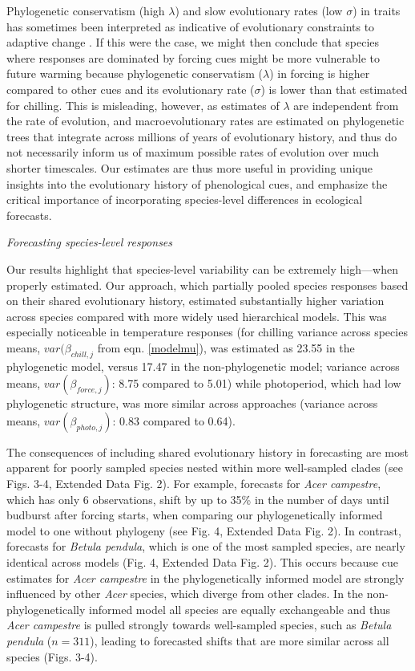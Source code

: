 \documentclass[11pt]{article}
\begin{document}
\par Phylogenetic conservatism (high $\lambda$) and slow evolutionary rates (low $\sigma$) in traits has sometimes been interpreted as indicative of evolutionary constraints to adaptive change \citep{wiens2010niche,bennett2021evolution}. If this were the case, we might then conclude that species where responses are dominated by forcing cues might be more vulnerable to future warming because phylogenetic conservatism ($\lambda$) in forcing is higher compared to other cues and its evolutionary rate ($\sigma$) is lower than that estimated for chilling. This is misleading, however, as estimates of $\lambda$ are independent from the rate of evolution, and macroevolutionary rates are estimated on phylogenetic trees that integrate across millions of years of evolutionary history, and thus do not necessarily inform us of maximum possible rates of evolution over much shorter timescales. Our estimates are thus more useful in providing unique insights into the evolutionary history of phenological cues, and emphasize the critical importance of incorporating species-level differences in ecological forecasts.


\emph{Forecasting species-level responses}

\par Our results highlight that species-level variability can be extremely high---when properly estimated. Our approach, which partially pooled species responses based on their shared evolutionary history, estimated substantially higher variation across species compared with more widely used hierarchical models. This was especially noticeable in temperature responses (for chilling variance across species means, $var(\beta_{chill,j}$ from eqn. \ref{modelmu}), was estimated as 23.55 in the phylogenetic model, versus 17.47 in the non-phylogenetic model; variance across means, $var(\beta_{force,j})$: 8.75 compared to 5.01) while photoperiod, which had low phylogenetic structure, was more similar across approaches (variance across means, $var(\beta_{photo,j})$: 0.83 compared to 0.64). 

\par The consequences of including shared evolutionary history in forecasting are most apparent for poorly sampled species nested within more well-sampled clades (see Figs. 3-4, Extended Data Fig. 2). For example, forecasts for \emph{Acer campestre}, which has only 6 observations, shift by up to 35\% in the number of days until budburst after forcing starts, when comparing our phylogenetically informed model to one without phylogeny (see Fig. 4, Extended Data Fig. 2). In contrast, forecasts for \emph{Betula pendula}, which is one of the most sampled species, are nearly identical across models (Fig. 4, Extended Data Fig. 2). This occurs because cue estimates for \emph{Acer campestre} in the phylogenetically informed model are strongly influenced by other \emph{Acer} species, which diverge from other clades. In the non-phylogenetically informed model all species are equally exchangeable and thus \emph{Acer campestre} is pulled strongly towards well-sampled species, such as \emph{Betula pendula} ($n = 311$), leading to forecasted shifts that are more similar across all species (Figs. 3-4). 
\end{document}
